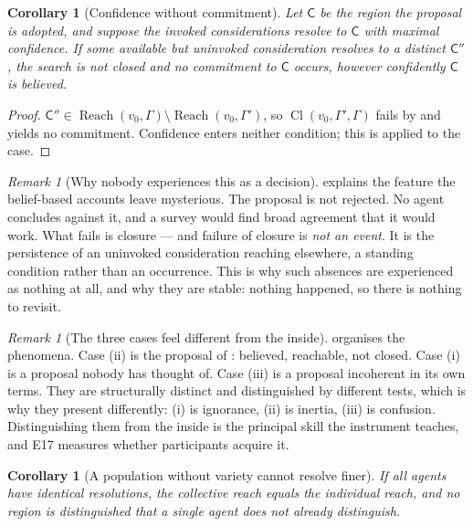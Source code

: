 \documentclass[11pt,a4paper]{article}
\theoremstyle{clstyle}
\newtheorem{corollary}[theorem]{Corollary}
\theoremstyle{definition}
\theoremstyle{remark}
\newtheorem{remark}[theorem]{Remark}
\DeclareMathOperator{\Reach}{Reach}
\DeclareMathOperator{\Cl}{Cl}
\newcommand{\Cell}{\mathsf{C}}
\begin{document}
\begin{corollary}[Confidence without commitment]
\label{cor:believed-unbuilt}
Let $\Cell$ be the region \emph{the proposal is adopted}, and suppose the
invoked considerations resolve to $\Cell$ with maximal confidence. If some
available but uninvoked consideration resolves to a distinct $\Cell''$, the
search is not closed and no commitment to $\Cell$ occurs, however
confidently $\Cell$ is believed.
\end{corollary}

\begin{proof}
$\Cell''\in\Reach(v_0,\Gamma)\setminus\Reach(v_0,\Gamma')$, so
$\Cl(v_0,\Gamma',\Gamma)$ fails by  and
 yields no commitment. Confidence enters neither
condition; this is  applied to the case.
\end{proof}

\begin{remark}[Why nobody experiences this as a decision]
\label{rem:no-decision}
 explains the feature the belief-based accounts
leave mysterious. The proposal is not rejected. No agent concludes against
it, and a survey would find broad agreement that it would work. What fails is
closure --- and failure of closure is \emph{not an event}. It is the
persistence of an uninvoked consideration reaching elsewhere, a standing
condition rather than an occurrence. This is why such absences are
experienced as nothing at all, and why they are stable: nothing happened, so
there is nothing to revisit.
\end{remark}

\begin{remark}[The three cases feel different from the inside]
\label{rem:three-feel}
 organises the phenomena. Case (ii) is the proposal
of : believed, reachable, not closed. Case (i) is a proposal
nobody has thought of. Case (iii) is a proposal incoherent in its own terms.
They are structurally distinct and distinguished by different tests, which is
why they present differently: (i) is ignorance, (ii) is inertia, (iii) is
confusion. Distinguishing them from the inside is the principal skill the
instrument teaches, and E17 measures whether participants acquire it.
\end{remark}

\begin{corollary}[A population without variety cannot resolve finer]
\label{cor:no-variety}
If all agents have identical resolutions, the collective reach equals the
individual reach, and no region is distinguished that a single agent does not
already distinguish.
\end{corollary}
\end{document}
